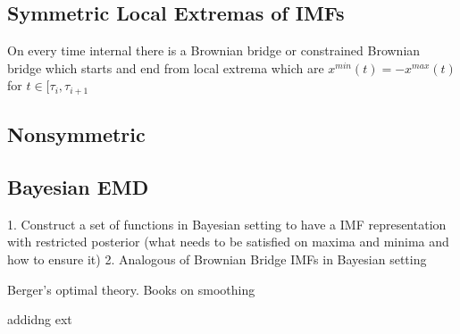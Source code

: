 \documentclass[article,moreauthors,pdftex,10pt,a4paper]{ssrn}
\begin{document}
\subsection{Symmetric Local Extremas of IMFs} 
On every time internal there is a Brownian bridge or constrained Brownian bridge which starts and end from local extrema which are $x^{min} (t)= -x^{max}(t)$ for $t \in [\tau_i,\tau_{i+1}$
\subsection{Nonsymmetric}

\subsection{Bayesian EMD}
1. Construct a set of functions in Bayesian setting to have a IMF representation with restricted posterior (what needs to be satisfied on maxima and minima and how to ensure it)
2. Analogous of Brownian Bridge IMFs in Bayesian setting

Berger's optimal theory. Books on smoothing


addidng ext
\end{document}
